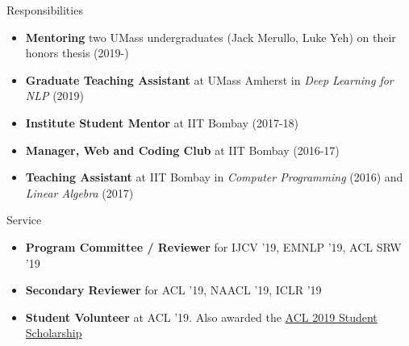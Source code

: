 \documentclass{resume} %
\begin{document}
\begin{rSection}{Responsibilities}
\vspace*{0.1in}
\begin{itemize}[leftmargin=*]
\item \textbf{Mentoring} two UMass undergraduates (Jack Merullo, Luke Yeh) on their honors thesis (2019-)
\item \textbf{Graduate Teaching Assistant} at UMass Amherst in \textit{Deep Learning for NLP} (2019)
\item \textbf{Institute Student Mentor} at IIT Bombay (2017-18)
\item \textbf{Manager, Web and Coding Club} at IIT Bombay (2016-17)
\item \textbf{Teaching Assistant} at IIT Bombay in \textit{Computer Programming} (2016) and \textit{Linear Algebra} (2017)
\end{itemize}
\end{rSection}

\begin{rSection}{Service}
\vspace*{0.1in}
\begin{itemize}[leftmargin=*]
\item \textbf{Program Committee / Reviewer} for IJCV '19, EMNLP '19, ACL SRW '19
\item \textbf{Secondary Reviewer} for ACL '19, NAACL '19, ICLR '19
\item \textbf{Student Volunteer} at ACL '19. Also awarded the \href{http://www.acl2019.org/EN/student-scholarship-applications-volunteers.xhtml}{ACL 2019 Student Scholarship}
\end{itemize}
\end{rSection}

\pagebreak
\end{document}

